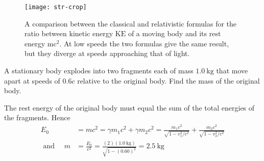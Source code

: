    

 

 \begin{figure}[H]
 	\centering
 	\texttt{[image: str-crop]}
 	\caption{ A comparison between the classical and relativistic formulas for the ratio between kinetic energy $\mathrm{KE}$ of a moving body and its rest energy $\mathrm{mc}^{2}$. At low speeds the two formulas give the same result, but they diverge at speeds approaching that of light.}
 	\label{}
 \end{figure}
\begin{exercise}
	A stationary body explodes into two fragments each of mass $1.0 \mathrm{~kg}$ that move apart at speeds of $0.6 c$ relative to the original body. Find the mass of the original body.
\end{exercise}
\begin{answer}
	The rest energy of the original body must equal the sum of the total energies of the fragments. Hence
	\begin{align*}
	E_{0}&=m c^{2}=\gamma m_{1} c^{2}+\gamma m_{2} c^{2}=\frac{m_{1} c^{2}}{\sqrt{1-v_{1}^{2} / c^{2}}}+\frac{m_{2} c^{2}}{\sqrt{1-v_{2}^{2} / c^{2}}}\\
\text{	and }\quad
	m&=\frac{E_{0}}{c^{2}}=\frac{(2)(1.0 \mathrm{~kg})}{\sqrt{1-(0.60)^{2}}}=2.5 \mathrm{~kg}
	\end{align*}
\end{answer}
